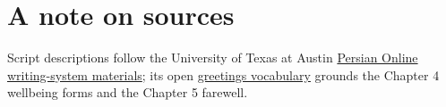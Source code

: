 
\backmatter





\chapter*{A note on sources}

Script descriptions follow the University of Texas at Austin
\href{https://sites.la.utexas.edu/persian_online_resources/the-writing-system/}%
{Persian Online writing-system materials}; its open
\href{https://sites.la.utexas.edu/persian_online_resources/vocabulary-lists/meetings-introductions/}%
{greetings vocabulary} grounds the Chapter 4 wellbeing forms and the Chapter 5
farewell.




